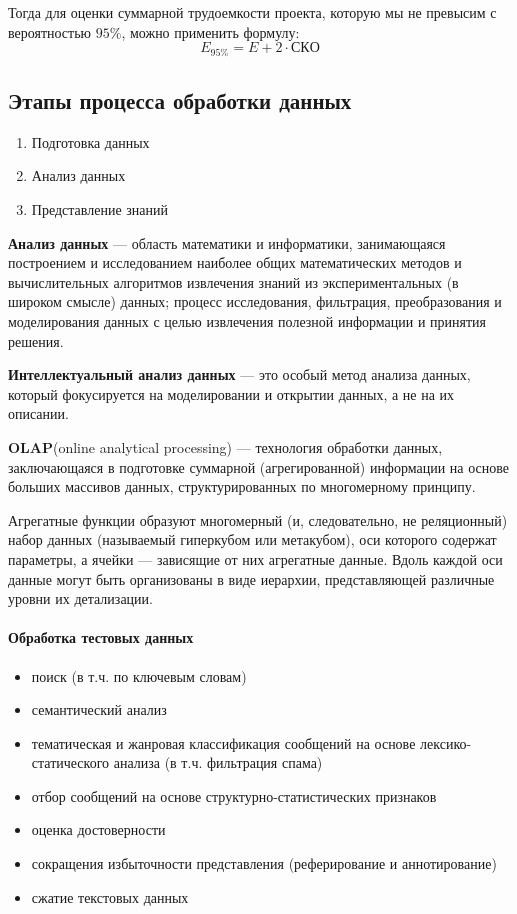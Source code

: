 Тогда для оценки суммарной трудоемкости проекта, которую мы не превысим с
вероятностью $95\%$, можно применить формулу:
\[
  E_{95\%} = E + 2 \cdot СКО
\] 

\subsection{Этапы процесса обработки данных}
\begin{enumerate}
  \item Подготовка данных
  \item Анализ данных
  \item Представление знаний 
\end{enumerate}

\textbf{Анализ данных} --- область математики и информатики, занимающаяся
построением и исследованием наиболее общих математических методов и
вычислительных алгоритмов извлечения знаний из экспериментальных (в широком
смысле) данных; процесс исследования, фильтрация, преобразования и моделирования
данных с целью извлечения полезной информации и принятия решения.

\textbf{Интеллектуальный анализ данных} --- это особый метод анализа данных,
который фокусируется на моделировании и открытии данных, а не на их описании.

\textbf{OLAP}(online analytical processing) --- технология обработки данных,
заключающаяся в подготовке суммарной (агрегированной) информации на основе
больших массивов данных, структурированных по многомерному принципу.

Агрегатные функции образуют многомерный (и, следовательно, не реляционный) набор
данных (называемый гиперкубом или метакубом), оси которого содержат параметры, а
ячейки --- зависящие от них агрегатные данные. Вдоль каждой оси данные могут
быть организованы в виде иерархии, представляющей различные уровни их
детализации.

\paragraph{Обработка тестовых данных}\mbox{}\par
\begin{itemize}
  \item поиск (в т.ч. по ключевым словам)
  \item семантический анализ
  \item тематическая и жанровая классификация сообщений на основе
    лексико-статического анализа (в т.ч. фильтрация спама)
  \item отбор сообщений на основе структурно-статистических признаков
  \item оценка достоверности
  \item сокращения избыточности представления (реферирование и аннотирование)
  \item сжатие текстовых данных
\end{itemize}
